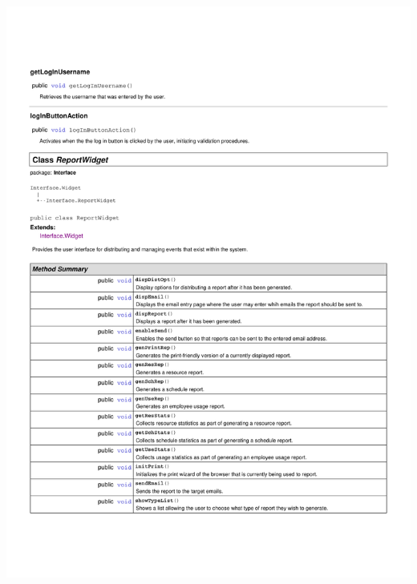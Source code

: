 \documentclass[letterpaper,12pt]{report}
\begin{document}
\includegraphics[scale=0.9,trim=20mm 30mm 25mm 25mm]{externals/InterfaceDataDictionary5.pdf}
\newpage
\end{document}

